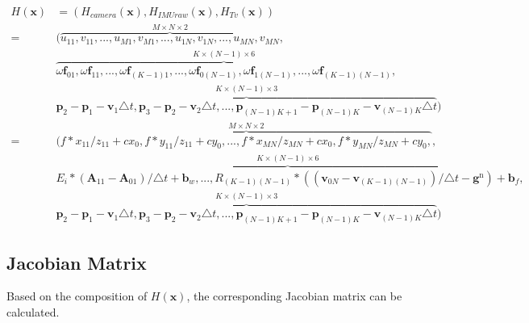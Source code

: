 \documentclass[12pt]{article}   %
\begin{document}
\begin{appendices}
\begin{align} %
H(\textbf{x}) &= (H_{camera}(\textbf{x}), H_{IMUraw}(\textbf{x}), H_{Tv}(\textbf{x})) \nonumber \\
=& (\overbrace{{u}_{11}, {v}_{11}, ... , {u}_{M1}, {v}_{M1}, ..., {u}_{1N}, {v}_{1N}, ... , {u}_{MN}, {v}_{MN}}^{M \times N \times 2}, \nonumber \\ 
& \overbrace{\omega\textbf{f}_{01}, \omega\textbf{f}_{11}, ... , \omega\textbf{f}_{(K-1)1}, ..., \omega\textbf{f}_{0(N-1)}, \omega\textbf{f}_{1(N-1)}, ... , \omega\textbf{f}_{(K-1)(N-1)}}^{K \times (N-1) \times 6}, \nonumber \\
& \overbrace{\textbf{p}_2 - \textbf{p}_{1} - \textbf{v}_{1} \triangle t, \textbf{p}_{3} - \textbf{p}_{2} - \textbf{v}_{2} \triangle t, ... , \textbf{p}_{(N-1)K+1} - \textbf{p}_{(N-1)K} - \textbf{v}_{(N-1)K} \triangle t}^{K \times (N-1) \times 3}) \nonumber \\
=& (\overbrace{f * x_{11} / z_{11} + cx_0, f * y_{11} / z_{11} + cy_0, ... , f * x_{MN} / z_{MN} + cx_0, f * y_{MN} / z_{MN} + cy_0, }^{M \times N \times 2}, \nonumber \\ 
& \overbrace{E_i*(\textbf{A}_{11} - \textbf{A}_{01})/\triangle t + \textbf{b}_w, ..., R_{(K-1)(N-1)} * ((\textbf{v}_{0N} - \textbf{v}_{(K-1)(N-1)}) / \triangle t - \textbf{g}^{\mathrm{n}}) + \textbf{b}_f}^{K \times (N-1) \times 6}, \nonumber \\
& \overbrace{\textbf{p}_2 - \textbf{p}_{1} - \textbf{v}_{1} \triangle t, \textbf{p}_{3} - \textbf{p}_{2} - \textbf{v}_{2} \triangle t, ... , \textbf{p}_{(N-1)K+1} - \textbf{p}_{(N-1)K} - \textbf{v}_{(N-1)K} \triangle t}^{K \times (N-1) \times 3}) 
\end{align}

\subsection{Jacobian Matrix}

Based on the composition of $H(\textbf{x})$, the corresponding Jacobian matrix can be calculated. 


\end{appendices}
\end{document}

